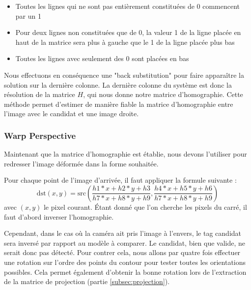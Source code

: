         \begin{itemize}
            \item Toutes les lignes qui ne sont pas entièrement constituées de 0 commencent par un 1
            \item Pour deux lignes non constituées que de 0, la valeur 1 de la ligne placée en haut de la matrice sera plus à gauche que le 1 de la ligne placée plus bas
            \item Toutes les lignes avec seulement des 0 sont placées en bas
        \end{itemize}
    
        Nous effectuons en conséquence une "back substitution" pour faire apparaître la solution sur la dernière colonne.
        La dernière colonne du système est donc la résolution de la matrice $H$, qui nous donne notre matrice d'homographie.
        Cette méthode permet d'estimer de manière fiable la matrice d'homographie entre l'image avec le candidat et une image droite.
        
            \subsubsection{Warp Perspective}

            Maintenant que la matrice d'homographie est établie, nous devons l'utiliser pour redresser l'image déformée dans la forme souhaitée.

            Pour chaque point de l'image d'arrivée, il faut appliquer la formule suivante :
            \begin{equation*}
                \text{dst}\left(x,y\right) = \text{src}\left(\frac{h1*x + h2*y + h3}{h7*x + h8*y + h9}, \frac{h4*x + h5*y + h6}{h7*x + h8*y + h9}\right)
            \end{equation*}
            avec $(x, y)$ le pixel courant. Étant donné que l'on cherche les pixels du carré, il faut d'abord inverser l'homographie.

            Cependant, dans le cas où la caméra ait pris l'image à l'envers, le tag candidat sera inversé par rapport au modèle à comparer. Le candidat, bien que valide, ne serait donc pas détecté. Pour contrer cela, nous allons par quatre fois effectuer une rotation sur l'ordre des points du contour pour tester toutes les orientations possibles. Cela permet également d'obtenir la bonne rotation lors de l'extraction de la matrice de projection (partie \ref{subsec:projection}).

